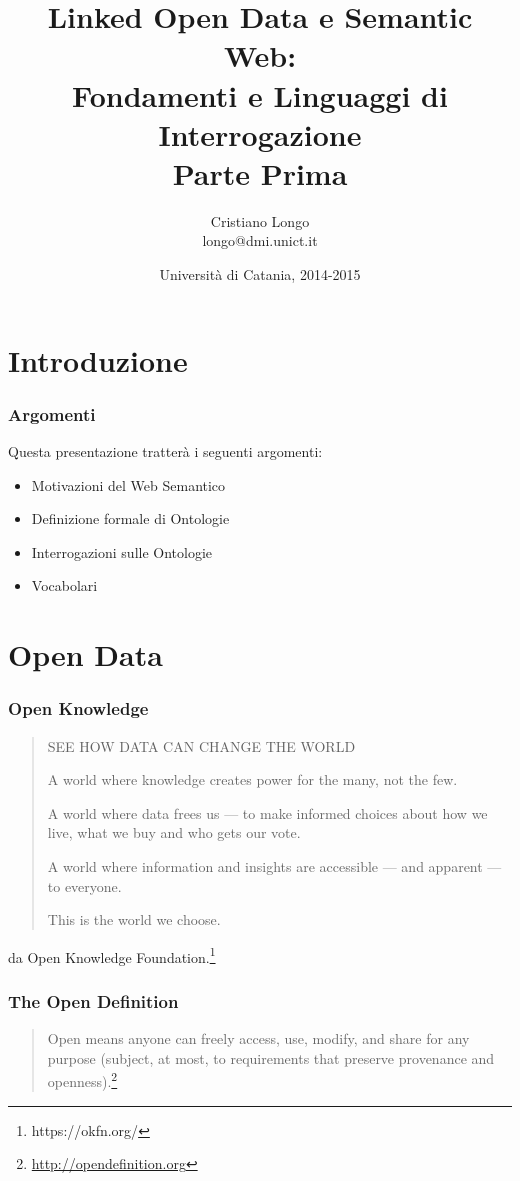 \documentclass[8pt]{beamer}
\title{Linked Open Data e Semantic Web:\\
Fondamenti e Linguaggi di Interrogazione\\
Parte Prima}
\author{Cristiano Longo\\ 
{\small{longo@dmi.unict.it}}}
\date{Universit\`a di Catania, 2014-2015}
\begin{document}
\maketitle
\setcounter{tocdepth}{1}

\section{Introduzione}

\begin{frame}
\frametitle{Argomenti}
Questa presentazione tratter\`a i seguenti argomenti:
\begin{itemize}
 \item Motivazioni del Web Semantico
 \item Definizione formale di Ontologie
 \item Interrogazioni sulle Ontologie
 \item Vocabolari
\end{itemize}
\end{frame}

\section{Open Data}
\begin{frame}
	\frametitle{Open Knowledge}
	\begin{quote}
SEE HOW DATA CAN CHANGE THE WORLD

A world where knowledge creates power for the many, not the few.

A world where data frees us — to make informed choices about how we live, what we buy and who gets our vote.

A world where information and insights are accessible — and apparent — to everyone.

This is the world we choose.	
	\end{quote}
	
	da Open Knowledge Foundation.\footnote{https://okfn.org/}
\end{frame}

\begin{frame}
\frametitle{The Open Definition}

\begin{quote}
Open means anyone can freely access, use, modify, and share for any purpose (subject, at most, to requirements that preserve provenance and openness).\footnote{\url{http://opendefinition.org}} 
\end{quote}
\end{frame}
\end{document}

